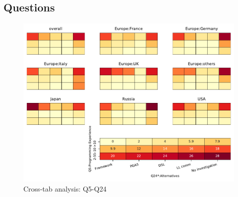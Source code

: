 
\subsection{Questions}


\begin{figure}
\begin{center}
\includegraphics[width=12cm]{../pdfs/Q5-Q24.pdf}
\caption{Cross-tab analysis: Q5-Q24}
\label{fig:Q5-Q24}
\end{center}
\end{figure}
